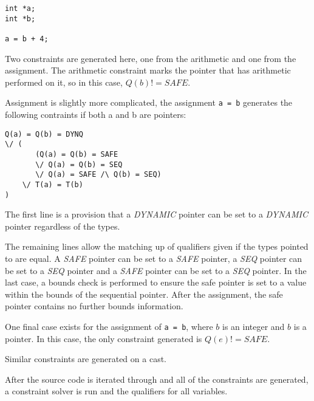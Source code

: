 \begin{verbatim}
int *a;
int *b;

a = b + 4;
\end{verbatim}

Two constraints are generated here, one from the arithmetic and one from the assignment.
The arithmetic constraint marks the pointer that has arithmetic performed on it, so in this case, $Q(b) != SAFE$.

Assignment is slightly more complicated, the assignment \verb|a = b| generates the following contraints if both a and b are pointers:

\begin{verbatim}
Q(a) = Q(b) = DYNQ 
\/ (
       (Q(a) = Q(b) = SAFE 
       \/ Q(a) = Q(b) = SEQ
       \/ Q(a) = SAFE /\ Q(b) = SEQ) 
    \/ T(a) = T(b)
)
\end{verbatim}

The first line is a provision that a \textit{DYNAMIC} pointer can be set to a \textit{DYNAMIC} pointer regardless of the types.

The remaining lines allow the matching up of qualifiers given if the types pointed to are equal.
A \textit{SAFE} pointer can be set to a \textit{SAFE} pointer, a \textit{SEQ} pointer can be set to a \textit{SEQ} pointer and a \textit{SAFE} pointer can be set to a \textit{SEQ} pointer.
In the last case, a bounds check is performed to ensure the safe pointer is set to a value within the bounds of the sequential pointer.
After the assignment, the safe pointer contains no further bounds information.

One final case exists for the assignment of \verb|a = b|, where $b$ is an integer and $b$ is a pointer.
In this case, the only constraint generated is $Q(e) != SAFE$.

Similar constraints are generated on a cast.

After the source code is iterated through and all of the constraints are generated, a constraint solver is run and the qualifiers for all variables.


